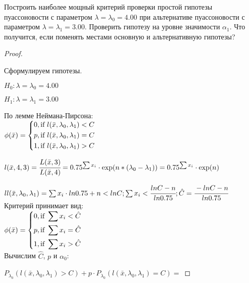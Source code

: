 \begin{problem}
	Построить наиболее мощный критерий проверки простой гипотезы пуассоновости с параметром $\lambda=\lambda_0=4.00$ при альтернативе пуассоновости с параметром $\lambda=\lambda_1=3.00$. Проверить гипотезу на уровне значимости $\alpha_1$. Что получится, если поменять местами основную и альтернативную гипотезы?
\end{problem}

\begin{proof}
	$ $
	
	Сформулируем гипотезы. 
	
	$H_0:\lambda=\lambda_0=4.00$ 
	
	$H_1:\lambda=\lambda_1=3.00$ 
	
	По лемме Неймана-Пирсона: \\
		
	$\phi(\bar x)=\left\{
	\begin{gathered}
		0, \text{if } l(\bar x, \lambda_0, \lambda_1)<C \hfill \\
		p, \text{if } l(\bar x, \lambda_0, \lambda_1)=C \hfill \\
		1, \text{if } l(\bar x, \lambda_0, \lambda_1)>C \hfill \\ 
	\end{gathered}
	\right.$
	
		$l(\bar x, 4, 3)=\cfrac{L(\bar x, 3)}{L(\bar x, 4)}=0.75^{\sum x_i}\cdot \exp(n*(\lambda_0-\lambda_1))=0.75^{\sum x_i}\cdot \exp(n)$ 
		
		$ll(\bar x, \lambda_0, \lambda_1)=\sum x_i\cdot ln0.75+n<lnC; \sum x_i < \cfrac{lnC-n}{ln0.75}; \hat{C}=\cfrac{-lnC-n}{ln0.75}$ \\
		
	Критерий принимает вид: \\
	
	$\phi(\bar x)=\left\{
	\begin{gathered}
		0, \text{if } \sum x_i<\hat{C} \hfill \\
		p, \text{if } \sum x_i=\hat{C} \hfill \\
		1, \text{if } \sum x_i>\hat{C} \hfill \\ 
	\end{gathered}
	\right.$	\\
	
	Вычислим $\hat{C}$, $p$ и $\alpha_0$:		

		$P_{\lambda_0}(l(\bar x, \lambda_0, \lambda_1)>C)+p\cdot P_{\lambda_0}(l(\bar x, \lambda_0, \lambda_1)=C)=$ 
		

\end{proof}
